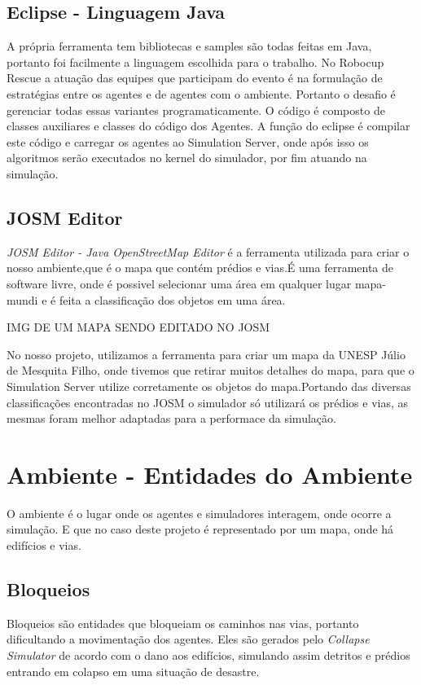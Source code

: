 \documentclass[conference]{IEEEtran}
\begin{document}
\subsection{Eclipse - Linguagem Java}
A própria ferramenta tem bibliotecas e samples são todas feitas em Java, portanto foi facilmente a linguagem escolhida para o trabalho. No Robocup Rescue a atuação das equipes que participam do evento é na formulação de estratégias entre os agentes e de agentes com o ambiente. Portanto o desafio é gerenciar todas essas variantes programaticamente. 
O código é composto de classes auxiliares e classes do código dos Agentes. A função do eclipse é compilar este código e carregar os agentes ao Simulation Server, onde após isso os algoritmos serão executados no kernel do simulador, por fim atuando na simulação.

\subsection{JOSM Editor}
\textit {JOSM Editor - Java OpenStreetMap Editor} é a ferramenta utilizada para criar o nosso ambiente,que é o mapa que contém prédios e vias.É uma ferramenta de software livre, onde é possivel selecionar uma área em qualquer lugar mapa-mundi e é feita a classificação dos objetos em uma área.

IMG DE UM MAPA SENDO EDITADO NO JOSM

No nosso projeto, utilizamos a ferramenta para criar um mapa da UNESP Júlio de Mesquita Filho, onde tivemos que retirar muitos detalhes do mapa, para que o Simulation Server utilize corretamente os objetos do mapa.Portando das diversas classificações encontradas no JOSM o simulador só utilizará os prédios e vias, as mesmas foram melhor adaptadas para a performace da simulação.

\section{Ambiente - Entidades do Ambiente}
O ambiente é o lugar onde os agentes e simuladores interagem, onde ocorre a simulação. E que no caso deste projeto é representado por um mapa, onde há edifícios e vias.
\subsection{Bloqueios}
Bloqueios são entidades que bloqueiam os caminhos nas vias, portanto dificultando a movimentação dos agentes.
Eles são gerados pelo \textit{Collapse Simulator} de acordo com o dano aos edifícios, simulando assim detritos e prédios entrando em colapso em uma situação de desastre.
\end{document}
